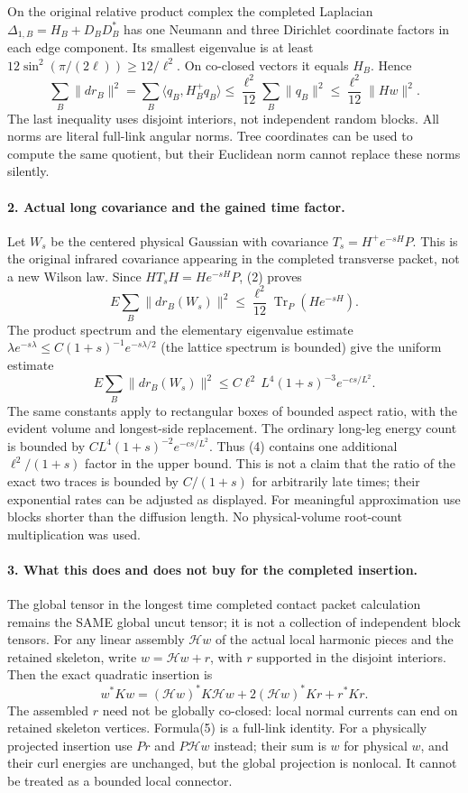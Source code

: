 \documentclass[11pt]{article}
\begin{document}
On the original relative product complex the completed Laplacian
$\Delta_{1,B}=H_B+D_BD_B^*$ has one Neumann and three Dirichlet
coordinate factors in each edge component. Its smallest eigenvalue
is at least $12\sin^2(\pi/(2\ell))\ge12/\ell^2$.
On co-closed vectors it equals $H_B$. Hence
\[
 \boxed{\sum_B\|dr_B\|^2
 =\sum_B\langle q_B,H_B^+q_B\rangle
 \le\frac{\ell^2}{12}\sum_B\|q_B\|^2
 \le\frac{\ell^2}{12}\|Hw\|^2.}                              \tag{2}
\]
The last inequality uses disjoint interiors, not independent random
blocks. All norms are literal full-link angular norms. Tree coordinates
can be used to compute the same quotient, but their Euclidean norm
cannot replace these norms silently.

\paragraph{2. Actual long covariance and the gained time factor.}
Let $W_s$ be the centered physical Gaussian with covariance
$T_s=H^+e^{-sH}P$. This is the original infrared covariance appearing
in the completed transverse packet, not a new Wilson law.
Since $HT_sH=He^{-sH}P$, (2) proves
\[
 E\sum_B\|dr_B(W_s)\|^2
 \le\frac{\ell^2}{12}\operatorname{Tr}_P(He^{-sH}).             \tag{3}
\]
The product spectrum and the elementary eigenvalue estimate
$\lambda e^{-s\lambda}\le C(1+s)^{-1}e^{-s\lambda/2}$
(the lattice spectrum is bounded) give the uniform estimate
\[
 \boxed{E\sum_B\|dr_B(W_s)\|^2
 \le C\ell^2\,L^4(1+s)^{-3}e^{-cs/L^2}.}                     \tag{4}
\]
The same constants apply to rectangular boxes of bounded aspect ratio,
with the evident volume and longest-side replacement. The ordinary
long-leg energy count is bounded by
$CL^4(1+s)^{-2}e^{-cs/L^2}$. Thus (4) contains one additional
$\ell^2/(1+s)$ factor in the upper bound. This is not a claim that the
ratio of the exact two traces is bounded by $C/(1+s)$ for arbitrarily
late times; their exponential rates can be adjusted as displayed.
For meaningful approximation use blocks shorter than the diffusion
length. No physical-volume root-count multiplication was used.

\paragraph{3. What this does and does not buy for the completed insertion.}
The global tensor in the longest time completed contact packet calculation remains the SAME global uncut tensor;
it is not a collection of independent block tensors. For any linear
assembly $\mathcal H w$ of the actual local harmonic pieces and the
retained skeleton, write $w=\mathcal H w+r$, with $r$ supported in the
disjoint interiors. Then the exact quadratic insertion is
\[
 w^*Kw=(\mathcal H w)^*K\mathcal H w
             +2(\mathcal H w)^*Kr+r^*Kr.                      \tag{5}
\]
The assembled $r$ need not be globally co-closed: local normal currents
can end on retained skeleton vertices. Formula(5) is a full-link
identity. For a physically projected insertion use $Pr$ and
$P\mathcal H w$ instead; their sum is $w$ for physical $w$, and their
curl energies are unchanged, but the global projection is nonlocal.
It cannot be treated as a bounded local connector.
\end{document}
